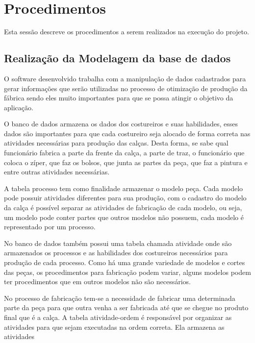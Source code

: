 \section{Procedimentos}

\par Esta sessão descreve os procedimentos a serem realizados na execução do
projeto.

\subsection{Realização da Modelagem da base de dados}

\par O software desenvolvido trabalha com a manipulação de dados cadastrados
para gerar informações que serão utilizadas no processo  de otimização de
produção da fábrica sendo eles muito importantes para que se possa atingir o
objetivo da aplicação. 

\par O banco de dados armazena os dados dos costureiros e suas habilidades,
esses dados são importantes para que cada costureiro seja alocado de forma
correta nas atividades necessárias para produção das calças. Desta forma, se
sabe qual funcionário fabrica a parte da frente da calça, a parte de traz, o
funcionário que coloca o zíper, que faz os bolsos, que junta as partes da peça,
que faz a pintura e entre outras atividades necessárias.

\par A tabela processo tem como finalidade armazenar o modelo peça. Cada
modelo pode possuir atividades diferentes para sua produção, com o cadastro
do modelo da calça é possível separar as atividades de fabricação de cada
modelo, ou seja, um modelo pode conter partes que outros modelos não possuem,
cada modelo é representado por um processo.

\par No banco de dados também possui uma tabela chamada atividade onde são
armazenados os processos e as habilidades dos costureiros necessários para
produção de cada processo.
Como há uma grande variedade de modelos e cortes das peças, os procedimentos
para fabricação podem variar, alguns modelos podem ter procedimentos que em outros
modelos não são necessários.

\par No processo de fabricação tem-se a necessidade de fabricar uma
determinada parte da peça para que outra venha a ser fabricada até que se chegue
no produto final que é a calça. A tabela atividade-ordem é responsável por
organizar as atividades para que sejam executadas na ordem correta. Ela
armazena as atividades 

